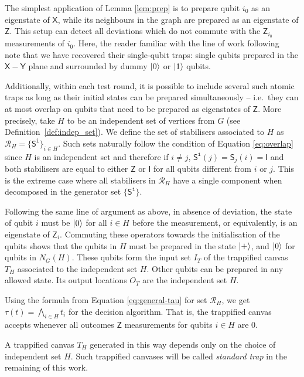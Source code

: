 \documentclass[12pt]{iopart}
\newcommand{\cptp}[1]{\mathsf{#1}} \newcommand{\pd}[1]{\mathcal{#1}}  \newcommand{\sch}[1]{\bm{#1}}
\newcommand{\Id}{\cptp{I}}
\newcommand{\X}{\cptp{X}}
\newcommand{\Z}{\cptp{Z}}
\newcommand{\Y}{\cptp{Y}}
\renewcommand{\1}{\mathds{1}}
\begin{document}
The simplest application of Lemma \ref{lem:prep} is to prepare qubit $i_0$ as an
eigenstate of $\X$, while its neighbours in the graph
are prepared as an eigenstate of $\Z$.
This setup can detect all deviations which do not
commute with the $\Z_{i_0}$ measurements of $i_0$.
Here, the reader familiar with the line of work
following~\cite{FK17:unconditionally} note that we have
recovered their single-qubit traps: single qubits prepared in the $\X-\Y$ plane
and surrounded by dummy $\ket 0$ or $\ket 1$ qubits.

Additionally, within each test round, it is possible to include
several such atomic traps as long as their initial states can be
prepared simultaneously -- i.e.~they can at most overlap on qubits
that need to be prepared as eigenstates of $\Z$. More precisely, take
$H$ to be an independent set of vertices from
$G$ (see Definition~\ref{def:indep_set}).
We define the set of stabilisers associated to $H$ as 
$\mathcal{R}_H = \{\cptp S^{\mathtt{i}}\}_{i \in H}$. Such sets naturally follow the 
condition of Equation \ref{eq:overlap} since $H$ is an independent set and 
therefore if $i \neq j$, $\cptp S^{\mathtt{i}}(j) = \cptp S_j(i) = \Id$ and 
both stabilisers are equal to either $\Z$ or $\Id$ for all qubits different from $i$ or $j$.
This is the extreme case where all stabilisers in $\mathcal{R}_H$ have
a single component when decomposed in the generator set $\{\cptp S^{\mathtt{i}}\}$.

Following the same line of argument as above, in absence of deviation, 
the state of qubit $i$ must be $\ket 0$ for
all $i\in H$ before the measurement, or equivalently, is an eigenstate
of $\Z_i$. Commuting these operators towards the initialisation of
the qubits shows that the qubits in $H$ must be prepared in the state
$\ket +$, and $\ket 0$ for qubits in $N_G(H)$. These qubits form the 
input set $I_T$ of the trappified canvas $T_H$ associated to the 
independent set $H$.
Other qubits can be prepared in any allowed state.
Its output locations $O_T$ are the independent
set $H$.

Using the formula from Equation \ref{eq:general-tau} for set $\mathcal{R}_H$,
we get $\tau(t) = \bigwedge_{i\in H} t_i$ for the decision algorithm. That is, the trappified canvas
accepts whenever all outcomes $\Z$ measurements for qubits $i\in
H$ are $0$.

A trappified canvas $T_H$ generated in this way depends only on the choice of
independent set $H$. Such trappified canvases will be called \emph{standard trap} in the remaining of this work.
\end{document}
